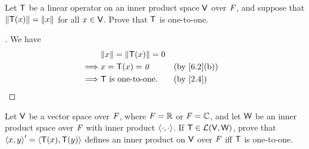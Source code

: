 \setcounter{ex}{16}
\begin{ex}\label{ex:6.1.17}
	Let \(\mathsf{T}\) be a linear operator on an inner product space \(\mathsf{V}\) over \(\mathit{F}\), and suppose that \(\left\lVert\mathsf{T}(x)\right\rVert = \left\lVert x\right\rVert\) for all \(x \in \mathsf{V}\).
	Prove that \(\mathsf{T}\) is one-to-one.
\end{ex}

\begin{proof}[]
	We have
	\begin{align*}
		         & \norm{x} = \norm{\T(x)} = 0                  \\
		\implies & x = \T(x) = \zv             &  & \by{6.2}[b] \\
		\implies & \T \text{ is one-to-one}.   &  & \by{2.4}
	\end{align*}
\end{proof}

\begin{ex}\label{ex:6.1.18}
	Let \(\mathsf{V}\) be a vector space over \(\mathit{F}\), where \(\mathit{F} = \mathbb{R}\) or \(\mathit{F} = \mathbb{C}\), and let \(\mathsf{W}\) be an inner product space over \(\mathit{F}\) with inner product \(\left\langle\cdot, \cdot\right\rangle\).
	If \(\mathsf{T} \in \mathcal{L}(\mathsf{V}, \mathsf{W})\), prove that \(\left\langle x, y\right\rangle' = \left\langle\mathsf{T}(x), \mathsf{T}(y)\right\rangle\) defines an inner product on \(\mathsf{V}\) over \(\mathit{F}\) iff \(\mathsf{T}\) is one-to-one.
\end{ex}

